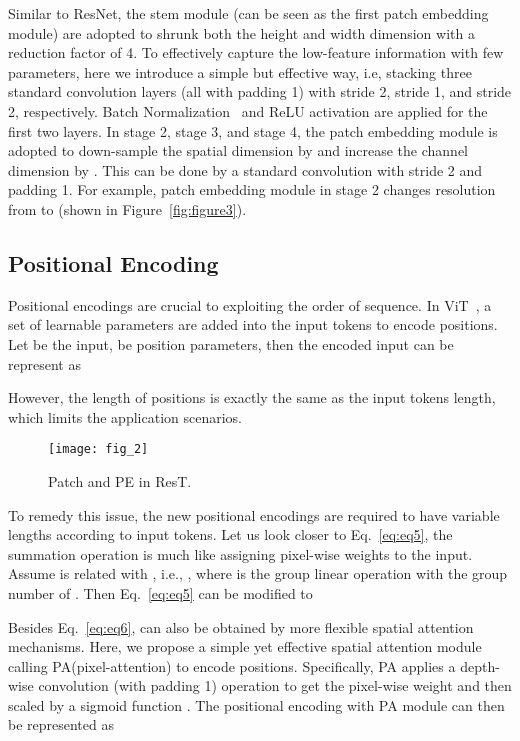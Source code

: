 \documentclass{article}
\begin{document}
Similar to ResNet, the stem module (can be seen as the first patch embedding module) are adopted to shrunk both the height and width dimension with a reduction factor of 4. To effectively capture the low-feature information with few parameters, here we introduce a simple but effective way, i.e, stacking three  standard convolution layers (all with padding 1) with stride 2, stride 1, and stride 2, respectively. Batch Normalization~\cite{DBLP:conf/icml/IoffeS15} and ReLU activation \cite{DBLP:journals/jmlr/GlorotBB11} are applied for the first two layers. In stage 2, stage 3, and stage 4, the patch embedding module is adopted to down-sample the spatial dimension by  and increase the channel dimension by . This can be done by a standard  convolution with stride 2 and padding 1. For example, patch embedding module in stage 2 changes resolution from  to  (shown in Figure~\ref{fig:figure3}). 


\subsection{Positional Encoding}
\label{sec:3.4}
Positional encodings are crucial to exploiting the order of sequence. In ViT~\cite{DBLP:journals/corr/abs-2010-11929}, a set of learnable parameters are added into the input tokens to encode positions. Let  be the input,  be position parameters, then the encoded input can be represent as

However, the length of positions is exactly the same as the input tokens length, which limits the application scenarios.   

\begin{wrapfigure}{r}{0.36\textwidth}
	\vspace{-30pt}
	\begin{center}
		\texttt{[image: fig\_2]}
	\end{center}
	\caption{Patch and PE in ResT.}
	\label{fig:figure2}
\end{wrapfigure}

To remedy this issue, the new positional encodings are required to have variable lengths according to input tokens. Let us look closer to Eq.~\ref{eq:eq5}, the summation operation is much like assigning pixel-wise weights to the input. Assume  is related with , i.e., , where  is the group linear operation with the group number of . Then Eq.~\ref{eq:eq5} can be modified to
 


Besides Eq.~\ref{eq:eq6},  can also be obtained by more flexible spatial attention mechanisms. Here, we propose a simple yet effective spatial attention module calling PA(pixel-attention) to encode positions. Specifically, PA applies a  depth-wise convolution (with padding 1) operation to get the pixel-wise weight and then scaled by a sigmoid function . The positional encoding with PA module can then be represented as
 
\end{document}
